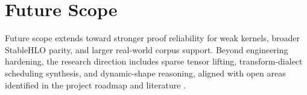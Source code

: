 \section{Future Scope}
Future scope extends toward stronger proof reliability for weak kernels, broader StableHLO parity, and larger real-world corpus support. Beyond engineering hardening, the research direction includes sparse tensor lifting, transform-dialect scheduling synthesis, and dynamic-shape reasoning, aligned with open areas identified in the project roadmap and literature \cite{stagg}.
